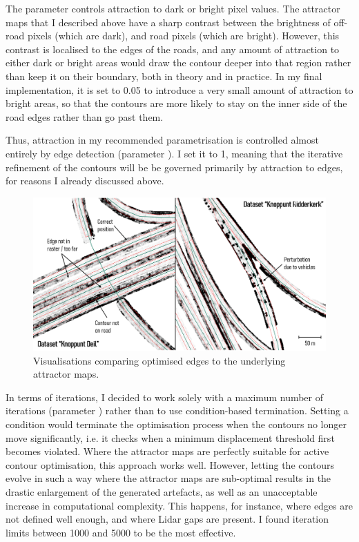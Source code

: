 The parameter  controls attraction to dark or bright pixel values. The attractor maps that I described above have a sharp contrast between the brightness of off-road pixels (which are dark), and road pixels (which are bright). However, this contrast is localised to the edges of the roads, and any amount of attraction to either dark or bright areas would draw the contour deeper into that region rather than keep it on their boundary, both in theory and in practice. In my final implementation, it is set to 0.05 to introduce a very small amount of attraction to bright areas, so that the contours are more likely to stay on the inner side of the road edges rather than go past them.

Thus, attraction in my recommended parametrisation is controlled almost entirely by edge detection (parameter ). I set it to 1, meaning that the iterative refinement of the contours will be be governed primarily by attraction to edges, for reasons I already discussed above.

\begin{figure}[h]
    \centering
    \includegraphics[width=\linewidth]{final_report/figs/activecontouroptimisation1.png}
    \caption{Visualisations comparing optimised edges to the underlying attractor maps.}
    \label{fig:activecontouroptimisation1}
\end{figure}

In terms of iterations, I decided to work solely with a maximum number of iterations (parameter ) rather than to use condition-based termination. Setting a condition would terminate the optimisation process when the contours no longer move significantly, i.e. it checks when a minimum displacement threshold first becomes violated. Where the attractor maps are perfectly suitable for active contour optimisation, this approach works well. However, letting the contours evolve in such a way where the attractor maps are sub-optimal results in the drastic enlargement of the generated artefacts, as well as an unacceptable increase in computational complexity. This happens, for instance, where edges are not defined well enough, and where Lidar gaps are present. I found iteration limits between 1000 and 5000 to be the most effective.

